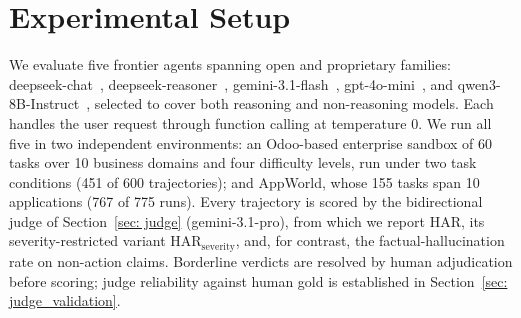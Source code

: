 \section{Experimental Setup}
\label{sec: experimental_setup}

We evaluate five frontier agents spanning open and proprietary families:
deepseek-chat~\citep{deepseekv3}, deepseek-reasoner~\citep{deepseekr1},
gemini-3.1-flash~\citep{gemini31flashlite}, gpt-4o-mini~\citep{gpt4o}, and
qwen3-8B-Instruct~\citep{qwen3}, selected to cover both reasoning and
non-reasoning models. Each handles the user request through function calling
at temperature $0$. We run all five in two independent environments: an
Odoo-based enterprise sandbox of 60 tasks over 10 business domains and four
difficulty levels, run under two task conditions (451 of 600 trajectories); and
AppWorld, whose 155 tasks span 10 applications
(767 of 775 runs). Every trajectory is scored by the bidirectional judge of
Section~\ref{sec: judge} (gemini-3.1-pro), from which we report HAR, its
severity-restricted variant $\mathrm{HAR}_{\mathrm{severity}}$, and, for
contrast, the factual-hallucination rate on non-action claims. Borderline
verdicts are resolved by human adjudication before scoring; judge reliability
against human gold is established in Section~\ref{sec: judge_validation}.


